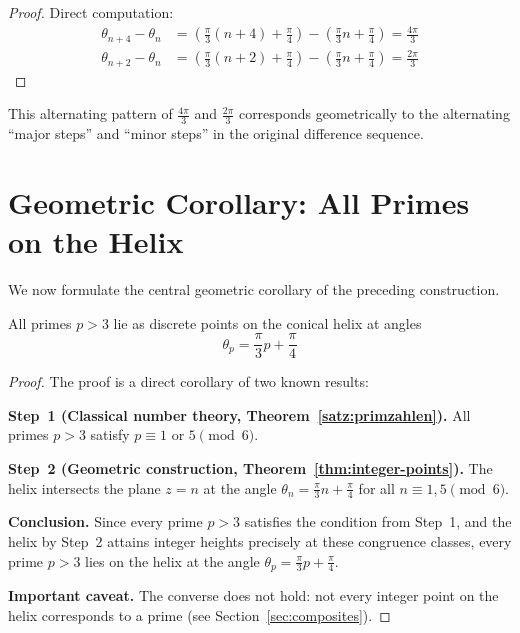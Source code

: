 \begin{proof}
Direct computation:
\begin{align}
\theta_{n+4} - \theta_n &= \left(\frac{\pi}{3}(n+4) + \frac{\pi}{4}\right) - \left(\frac{\pi}{3}n + \frac{\pi}{4}\right) = \frac{4\pi}{3}\\
\theta_{n+2} - \theta_n &= \left(\frac{\pi}{3}(n+2) + \frac{\pi}{4}\right) - \left(\frac{\pi}{3}n + \frac{\pi}{4}\right) = \frac{2\pi}{3}
\end{align}
\end{proof}

\begin{remark}\label{rem:alternating-pattern}
This alternating pattern of $\frac{4\pi}{3}$ and $\frac{2\pi}{3}$
corresponds geometrically to the alternating ``major steps'' and ``minor
steps'' in the original difference sequence.
\end{remark}

\section{Geometric Corollary: All Primes on the Helix}

We now formulate the central geometric corollary of the preceding
construction.

\begin{theorem}\label{thm:primes-on-helix}
All primes $p > 3$ lie as discrete points on the conical helix at angles
\begin{equation}\label{eq:prime-angles}
\boxed{\theta_p = \frac{\pi}{3}p + \frac{\pi}{4}}
\end{equation}
\end{theorem}

\begin{proof}
The proof is a direct corollary of two known results:

\textbf{Step~1 (Classical number theory, Theorem~\ref{satz:primzahlen}).}
All primes $p > 3$ satisfy $p \equiv 1$ or $5 \pmod{6}$.

\textbf{Step~2 (Geometric construction, Theorem~\ref{thm:integer-points}).}
The helix intersects the plane $z = n$ at the angle
$\theta_n = \frac{\pi}{3}n + \frac{\pi}{4}$ for all
$n \equiv 1, 5 \pmod{6}$.

\textbf{Conclusion.} Since every prime $p > 3$ satisfies the condition
from Step~1, and the helix by Step~2 attains integer heights precisely at
these congruence classes, every prime $p > 3$ lies on the helix at the
angle $\theta_p = \frac{\pi}{3}p + \frac{\pi}{4}$.

\textbf{Important caveat.} The converse does not hold: not every integer
point on the helix corresponds to a prime (see
Section~\ref{sec:composites}).
\end{proof}

